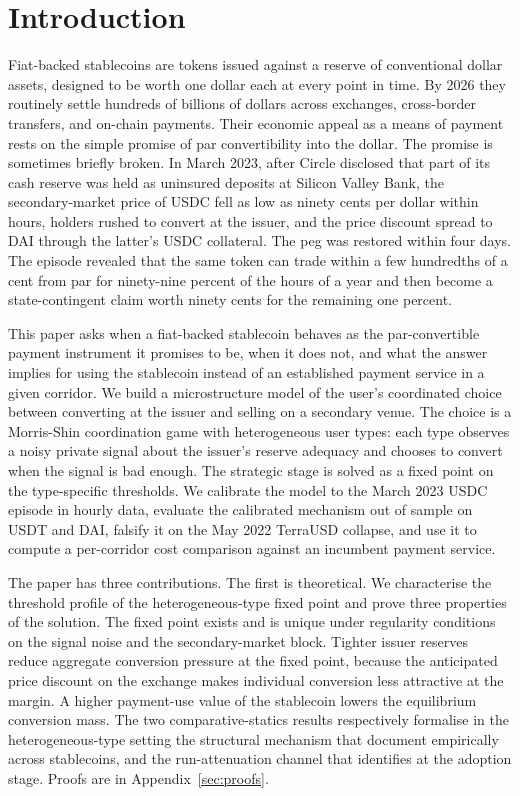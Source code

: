 \section{Introduction}\label{sec:introduction}

Fiat-backed stablecoins are tokens issued against a reserve of conventional dollar assets, designed to be worth one dollar each at every point in time. By 2026 they routinely settle hundreds of billions of dollars across exchanges, cross-border transfers, and on-chain payments. Their economic appeal as a means of payment rests on the simple promise of par convertibility into the dollar. The promise is sometimes briefly broken. In March 2023, after Circle disclosed that part of its cash reserve was held as uninsured deposits at Silicon Valley Bank, the secondary-market price of USDC fell as low as ninety cents per dollar within hours, holders rushed to convert at the issuer, and the price discount spread to DAI through the latter's USDC collateral. The peg was restored within four days. The episode revealed that the same token can trade within a few hundredths of a cent from par for ninety-nine percent of the hours of a year and then become a state-contingent claim worth ninety cents for the remaining one percent.

This paper asks when a fiat-backed stablecoin behaves as the par-convertible payment instrument it promises to be, when it does not, and what the answer implies for using the stablecoin instead of an established payment service in a given corridor. We build a microstructure model of the user's coordinated choice between converting at the issuer and selling on a secondary venue. The choice is a Morris-Shin coordination game with heterogeneous user types: each type observes a noisy private signal about the issuer's reserve adequacy and chooses to convert when the signal is bad enough. The strategic stage is solved as a fixed point on the type-specific thresholds. We calibrate the model to the March 2023 USDC episode in hourly data, evaluate the calibrated mechanism out of sample on USDT and DAI, falsify it on the May 2022 TerraUSD collapse, and use it to compute a per-corridor cost comparison against an incumbent payment service.

The paper has three contributions. The first is theoretical. We characterise the threshold profile of the heterogeneous-type fixed point and prove three properties of the solution. The fixed point exists and is unique under regularity conditions on the signal noise and the secondary-market block. Tighter issuer reserves reduce aggregate conversion pressure at the fixed point, because the anticipated price discount on the exchange makes individual conversion less attractive at the margin. A higher payment-use value of the stablecoin lowers the equilibrium conversion mass. The two comparative-statics results respectively formalise in the heterogeneous-type setting the structural mechanism that \citet{ma_zeng_zhang_2025} document empirically across stablecoins, and the run-attenuation channel that \citet{bertsch_2025_adoption_fragility} identifies at the adoption stage. Proofs are in Appendix~\ref{sec:proofs}.

